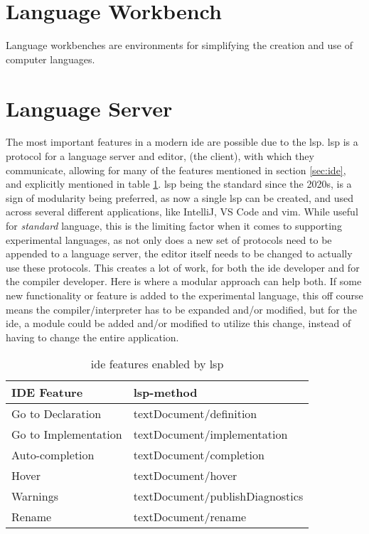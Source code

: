 \section{Language Workbench}

Language workbenches are environments for simplifying the creation and use of
computer languages. \cite{lwb}


\section{Language Server}

The most important features in a modern \gls{ide} are possible due to the
\gls{lsp}. \gls{lsp} is a protocol for a language server and editor,
(the client), with which they communicate, allowing for many of the features
mentioned in section \ref{sec:ide}, and explicitly mentioned in table
\ref{tbl:ide}. \gls{lsp} being the standard since the 2020s, is a sign of
modularity being preferred, as now a single \gls{lsp} can be created, and used
across several different applications, like IntelliJ, VS Code and \gls{vim}.
While useful for \textit{standard} language, this is the limiting factor when it
comes to supporting experimental languages, as not only does a new set of
protocols need to be appended to a language server, the editor itself needs to
be changed to actually use these protocols. This creates a lot of work, for both
the \gls{ide} developer and for the compiler developer. Here is where a modular
approach can help both. If some new functionality or feature is added to the
experimental language, this off course means the compiler/interpreter has to be
expanded and/or modified, but for the \gls{ide}, a module could be added and/or
modified to utilize this change, instead of having to change the entire
application.

\begin{table}[]
  \centering
  \caption{\gls{ide} features enabled by \gls{lsp}}
  \label{tbl:ide}
  \begin{tabular}{|l|l|}
    \hline
    IDE Feature & \gls{lsp}-method \\ \hline
    Go to Declaration & textDocument/definition \\ \hline
    Go to Implementation & textDocument/implementation \\ \hline
    Auto-completion & textDocument/completion \\ \hline
    Hover & textDocument/hover \\ \hline
    Warnings & textDocument/publishDiagnostics \\ \hline
    Rename & textDocument/rename \\ \hline
  \end{tabular}
\end{table}

